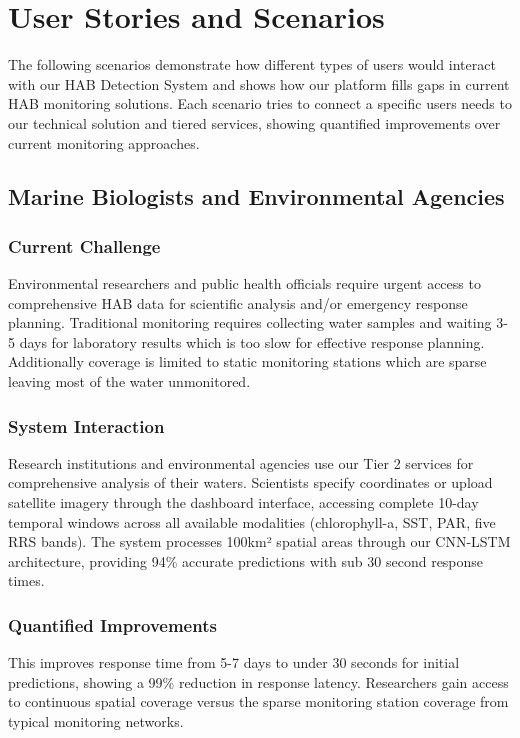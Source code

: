 \documentclass[conference]{IEEEtran}
\begin{document}
\section{User Stories and Scenarios}

The following scenarios demonstrate how different types of users would interact with our HAB Detection System and shows how our platform fills gaps in current HAB monitoring solutions. Each scenario tries to connect a specific users needs to our technical solution and tiered services, showing quantified improvements over current monitoring approaches.

\subsection{Marine Biologists and Environmental Agencies}

\subsubsection{Current Challenge}
Environmental researchers and public health officials require urgent access to comprehensive HAB data for scientific analysis and/or emergency response planning. Traditional monitoring requires collecting water samples and waiting 3-5 days for laboratory results which is too slow for effective response planning. Additionally coverage is limited to static monitoring stations which are sparse leaving most of the water unmonitored.

\subsubsection{System Interaction}
Research institutions and environmental agencies use our Tier 2 services for comprehensive analysis of their waters. Scientists specify coordinates or upload satellite imagery through the dashboard interface, accessing complete 10-day temporal windows across all available modalities (chlorophyll-a, SST, PAR, five RRS bands). The system processes 100km² spatial areas through our CNN-LSTM architecture, providing 94\% accurate predictions with sub 30 second response times.
\subsubsection{Quantified Improvements}
This improves response time from 5-7 days to under 30 seconds for initial predictions, showing a 99\% reduction in response latency. Researchers gain access to continuous spatial coverage versus the sparse monitoring station coverage from typical monitoring networks.
\end{document}
